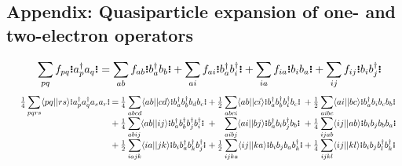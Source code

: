 \documentclass[11pt,fleqn]{article}
\newcommand{\dg}{\ensuremath{^\dagger}}
\newcommand{\ds}{\displaystyle}
\newcommand{\ip}[1]{\ensuremath{\langle#1\rangle}}
\newcommand{\GNO}[1]{\setstackgap{S}{0.7pt}\ensuremath{\Shortstack{\textbf{.} \textbf{.} \textbf{.}}#1\Shortstack{\textbf{.} \textbf{.} \textbf{.}}}}
\theoremstyle{mystyle}
\begin{document}
\subsection*{Appendix: Quasiparticle expansion of one- and two-electron operators}
\begin{align}
\label{one-particle-quasiparticle-expansion}
&&
  \sum_{pq}
  f_{pq}\GNO{a_p\dg a_q}
=
  \sum_{ab}
  f_{ab}\GNO{b_a\dg b_b}
+
  \sum_{ai}
  f_{ai}\GNO{b_a\dg b_i\dg}
+
  \sum_{ia}
  f_{ia}\GNO{b_ib_a}
+
  \sum_{ij}
  f_{ij}\GNO{b_ib_j\dg}
\end{align}
\begin{align}
&&
\label{two-particle-quasiparticle-expansion}
\begin{array}{r@{\hspace{2pt}}c@{\hspace{2pt}}c@{\hspace{2pt}}l@{\hspace{2pt}}c@{\hspace{2pt}}c@{\hspace{2pt}}l@{\hspace{2pt}}c@{\hspace{2pt}}c@{\hspace{2pt}}l}
  \tfrac{1}{4}
  \ds\sum_{pqrs}
  \ip{pq||rs}
  \GNO{a_p\dg a_q\dg a_sa_r}
&
=
&
  \tfrac{1}{4}
&
  \ds\sum_{abcd}
  \ip{ab||cd}
  \GNO{b_a\dg b_b\dg b_db_c}
&
+
&
  \tfrac{1}{2}
&
  \ds\sum_{abci}
  \ip{ab||ci}
  \GNO{b_a\dg b_b\dg b_i\dg b_c}
&
+
&
  \tfrac{1}{2}
&
  \ds\sum_{aibc}
  \ip{ai||bc}
  \GNO{b_a\dg b_ib_cb_b}
\\[5pt]
&
+
&
  \tfrac{1}{4}
&
  \ds\sum_{abij}
  \ip{ab||ij}
  \GNO{b_a\dg b_b\dg b_j\dg b_i\dg}
&
+
&
&
  \ds\sum_{aibj}
  \ip{ai||bj}
  \GNO{b_a\dg b_i b_j\dg b_b}
&
+
&
  \tfrac{1}{4}
&
  \ds\sum_{ijab}
  \ip{ij||ab}
  \GNO{b_i b_j b_bb_a}
\\
&
+
&
  \tfrac{1}{2}
&
  \ds\sum_{iajk}
  \ip{ia||jk}
  \GNO{b_i b_a\dg b_k\dg b_j\dg}
&
+
&
  \tfrac{1}{2}
&
  \ds\sum_{ijka}
  \ip{ij||ka}
  \GNO{b_ib_jb_ab_k\dg}
&
+
&
  \tfrac{1}{4}
&
  \ds\sum_{ijkl}
  \ip{ij||kl}
  \GNO{b_ib_jb_l\dg b_k\dg}
\end{array}
\end{align}
\end{document}
